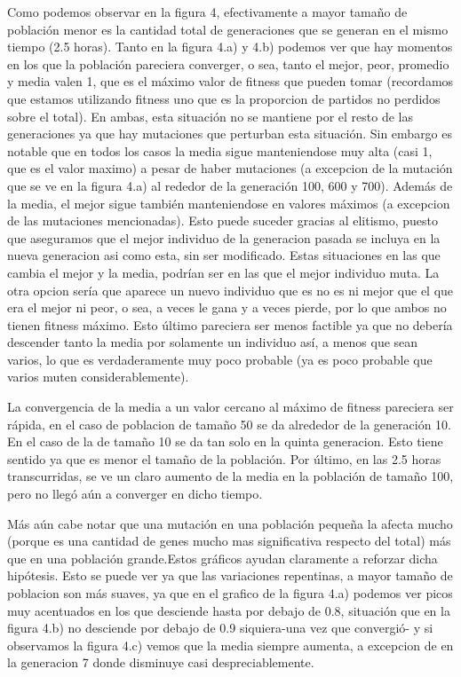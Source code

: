 \documentclass[A4paper,oneside,fleqn,11pt]{article}
\theoremstyle{definition}
\begin{document}
Como podemos observar en la figura 4, efectivamente a mayor tamaño de población menor es la cantidad total de generaciones que se generan en el mismo tiempo (2.5 horas). Tanto en la figura 4.a) y 4.b) podemos ver que hay momentos en los que la población pareciera converger, o sea, tanto el mejor, peor, promedio y media valen 1, que es el máximo valor de fitness que pueden tomar (recordamos que estamos utilizando fitness uno que es la proporcion de partidos no perdidos sobre el total). En ambas, esta situación no se mantiene por el resto de las generaciones ya que hay mutaciones que perturban esta situación. Sin embargo es notable que en todos los casos la media sigue manteniendose muy alta (casi 1, que es el valor maximo) a pesar de haber mutaciones (a excepcion de la mutación que se ve en la figura 4.a) al rededor de la generación  100, 600 y 700). Además de la media, el mejor sigue también manteniendose en valores máximos (a excepcion de las mutaciones mencionadas). Esto puede suceder gracias al elitismo, puesto que aseguramos que el mejor individuo de la generacion pasada se incluya en la nueva generacion asi como esta, sin ser modificado. Estas situaciones en las que cambia el mejor y la media, podrían ser en las que el mejor individuo muta. La otra opcion sería que aparece un nuevo individuo que es no es ni mejor que el que era el mejor ni peor, o sea, a veces le gana y a veces pierde, por lo que ambos no tienen fitness máximo. Esto último pareciera ser menos factible ya que no debería descender tanto la media por solamente un individuo así, a menos que sean varios, lo que es verdaderamente muy poco probable (ya es poco probable que varios muten considerablemente).

La convergencia de la media a un valor cercano al máximo de fitness pareciera ser rápida, en el caso de poblacion de tamaño 50 se da alrededor de la generación 10. En el caso de la de tamaño 10 se da tan solo en la quinta generacion. Esto tiene sentido ya que es menor el tamaño de la población. Por último, en las 2.5 horas transcurridas, se ve un claro aumento de la media en la población de tamaño 100, pero no llegó aún a converger en dicho tiempo.

Más aún cabe notar que una mutación en una población pequeña la afecta mucho (porque es una cantidad de genes mucho mas significativa respecto del total) más que en una población grande.Estos gráficos ayudan claramente a reforzar dicha hipótesis. Esto se puede ver ya que las variaciones repentinas, a mayor tamaño de poblacion son más suaves, ya que en el grafico de la figura 4.a) podemos ver picos muy acentuados en los que desciende hasta por debajo de 0.8, situación que en la figura 4.b) no desciende por debajo de 0.9 siquiera-una vez que convergió- y si observamos la figura 4.c) vemos que la media siempre aumenta, a excepcion de en la generacion 7 donde disminuye casi despreciablemente. 
\end{document}
